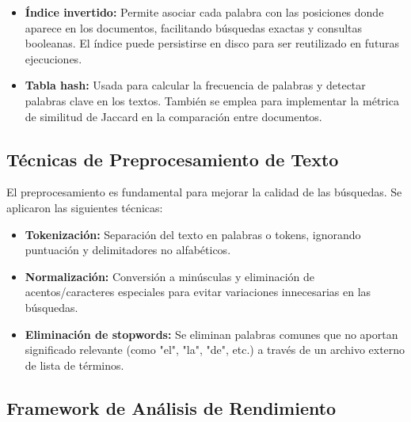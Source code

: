 \documentclass[9pt,letterpaper,onecolumn]{rho-class/rho}
\begin{document}
\begin{itemize}
    \item \textbf{Índice invertido:}  
    Permite asociar cada palabra con las posiciones donde aparece en los documentos, facilitando búsquedas exactas y consultas booleanas. El índice puede persistirse en disco para ser reutilizado en futuras ejecuciones.

    \item \textbf{Tabla hash:}  
    Usada para calcular la frecuencia de palabras y detectar palabras clave en los textos. También se emplea para implementar la métrica de similitud de Jaccard en la comparación entre documentos.
\end{itemize}


\subsection{Técnicas de Preprocesamiento de Texto}

El preprocesamiento es fundamental para mejorar la calidad de las búsquedas. Se aplicaron las siguientes técnicas:

\begin{itemize}
    \item \textbf{Tokenización:}  
    Separación del texto en palabras o tokens, ignorando puntuación y delimitadores no alfabéticos.

    \item \textbf{Normalización:}  
    Conversión a minúsculas y eliminación de acentos/caracteres especiales para evitar variaciones innecesarias en las búsquedas.

    \item \textbf{Eliminación de stopwords:}  
    Se eliminan palabras comunes que no aportan significado relevante (como "el", "la", "de", etc.) a través de un archivo externo de lista de términos.
\end{itemize}


\subsection{Framework de Análisis de Rendimiento}
\end{document}
